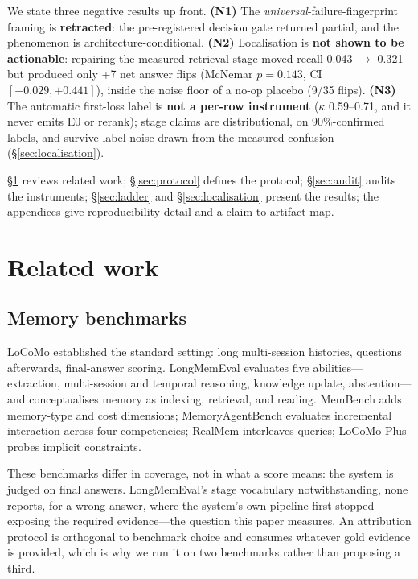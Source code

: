 \documentclass[11pt]{article}
\begin{document}
We state three negative results up front. \textbf{(N1)} The
\emph{universal}-failure-fingerprint framing is \textbf{retracted}: the
pre-registered decision gate returned partial, and the phenomenon is
architecture-conditional. \textbf{(N2)} Localisation is \textbf{not shown to
be actionable}: repairing the measured retrieval stage moved recall
0.043 $\to$ 0.321 but produced only +7 net answer flips (McNemar $p = 0.143$,
CI $[-0.029, +0.441]$), inside the noise floor of a no-op placebo (9/35
flips). \textbf{(N3)} The automatic first-loss label is \textbf{not a per-row
instrument} ($\kappa$ 0.59--0.71, and it never emits E0 or rerank); stage
claims are distributional, on 90\%-confirmed labels, and survive label noise
drawn from the measured confusion (\S\ref{sec:localisation}).

\S\ref{sec:related} reviews related work; \S\ref{sec:protocol} defines the
protocol; \S\ref{sec:audit} audits the instruments; \S\ref{sec:ladder} and
\S\ref{sec:localisation} present the results; the appendices give
reproducibility detail and a claim-to-artifact map.

\section{Related work}
\label{sec:related}

\subsection{Memory benchmarks}

LoCoMo \citep{maharana-etal-2024-locomo} established the standard setting:
long multi-session histories, questions afterwards, final-answer scoring.
LongMemEval \citep{wu2025longmemeval} evaluates five abilities---extraction,
multi-session and temporal reasoning, knowledge update, abstention---and
conceptualises memory as indexing, retrieval, and reading. MemBench
\citep{tan-etal-2025-membench} adds memory-type and cost dimensions;
MemoryAgentBench \citep{hu2025memoryagentbench} evaluates incremental
interaction across four competencies; RealMem \citep{bian2026realmem}
interleaves queries; LoCoMo-Plus \citep{li2026locomoplus} probes implicit
constraints.

These benchmarks differ in coverage, not in what a score means: the system is
judged on final answers. LongMemEval's stage vocabulary notwithstanding, none
reports, for a wrong answer, where the system's own pipeline first stopped
exposing the required evidence---the question this paper measures. An
attribution protocol is orthogonal to benchmark choice and consumes whatever
gold evidence is provided, which is why we run it on two benchmarks rather
than proposing a third.
\end{document}
